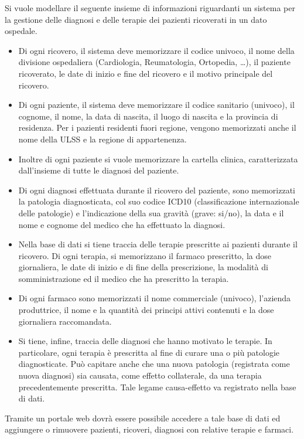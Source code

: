 \documentclass{article}
\begin{document}
Si vuole modellare il seguente insieme di informazioni riguardanti un sistema per la gestione delle diagnosi e delle terapie dei pazienti ricoverati in un dato ospedale.
\begin{itemize}
  \item Di ogni ricovero, il sistema deve memorizzare il codice univoco, il nome della divisione ospedaliera (Cardiologia, Reumatologia, Ortopedia, \dots ), il paziente ricoverato, le date di inizio e fine del ricovero e il motivo principale del ricovero.
  \item Di ogni paziente, il sistema deve memorizzare il codice sanitario (univoco), il cognome, il nome, la data di nascita, il luogo di nascita e la provincia di residenza.
    Per i pazienti residenti fuori regione, vengono memorizzati anche il nome della ULSS e la regione di appartenenza.
  \item Inoltre di ogni paziente si vuole memorizzare la cartella clinica, caratterizzata dall'insieme di tutte le diagnosi del paziente.
  \item Di ogni diagnosi effettuata durante il ricovero del paziente, sono memorizzati la patologia diagnosticata, col suo codice ICD10 (classificazione internazionale delle patologie) e l’indicazione della sua gravità (grave: si/no), la data e il nome e cognome del medico che ha effettuato la diagnosi.
  \item Nella base di dati si tiene traccia delle terapie prescritte ai pazienti durante il ricovero.
    Di ogni terapia, si memorizzano il farmaco prescritto, la dose giornaliera, le date di inizio e di fine della prescrizione, la modalità di somministrazione ed il medico che ha prescritto la terapia.
  \item Di ogni farmaco sono memorizzati il nome commerciale (univoco), l’azienda produttrice, il nome e la quantità dei principi attivi contenuti e la dose giornaliera raccomandata.
  \item Si tiene, infine, traccia delle diagnosi che hanno motivato le terapie.
    In particolare, ogni terapia è prescritta al fine di curare una o più patologie diagnosticate.
    Può capitare anche che una nuova patologia (registrata come nuova diagnosi) sia causata, come effetto collaterale, da una terapia precedentemente prescritta.
    Tale legame causa-effetto va registrato nella base di dati.
\end{itemize}
Tramite un portale web dovrà essere possibile accedere a tale base di dati ed aggiungere o rimuovere pazienti, ricoveri, diagnosi con relative terapie e farmaci. 
\end{document}

